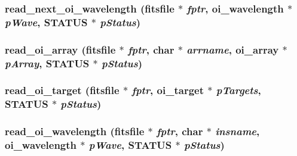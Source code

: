 \label{group__oitable_ga28b44f612e1d227e021ce07279956375}
\hypertarget{group__oitable_ga3dce8694156456cdebb077eaa7a9cce2}{
\subsubsection[{read\_\-next\_\-oi\_\-wavelength}]{ read\_\-next\_\-oi\_\-wavelength (fitsfile $\ast$ {\em fptr}, \/  {\bf oi\_\-wavelength} $\ast$ {\em pWave}, \/  {\bf STATUS} $\ast$ {\em pStatus})}}
\label{group__oitable_ga3dce8694156456cdebb077eaa7a9cce2}
\hypertarget{group__oitable_ga5dcb2c1f0b5945c505312bf7d74a0406}{
\subsubsection[{read\_\-oi\_\-array}]{ read\_\-oi\_\-array (fitsfile $\ast$ {\em fptr}, \/  char $\ast$ {\em arrname}, \/  {\bf oi\_\-array} $\ast$ {\em pArray}, \/  {\bf STATUS} $\ast$ {\em pStatus})}}
\label{group__oitable_ga5dcb2c1f0b5945c505312bf7d74a0406}
\hypertarget{group__oitable_ga661f4bdb8557b4a72f4f022db686fd19}{
\subsubsection[{read\_\-oi\_\-target}]{ read\_\-oi\_\-target (fitsfile $\ast$ {\em fptr}, \/  {\bf oi\_\-target} $\ast$ {\em pTargets}, \/  {\bf STATUS} $\ast$ {\em pStatus})}}
\label{group__oitable_ga661f4bdb8557b4a72f4f022db686fd19}
\hypertarget{group__oitable_gabd408e019a9889c75d3791b682ec9a37}{
\subsubsection[{read\_\-oi\_\-wavelength}]{ read\_\-oi\_\-wavelength (fitsfile $\ast$ {\em fptr}, \/  char $\ast$ {\em insname}, \/  {\bf oi\_\-wavelength} $\ast$ {\em pWave}, \/  {\bf STATUS} $\ast$ {\em pStatus})}}
